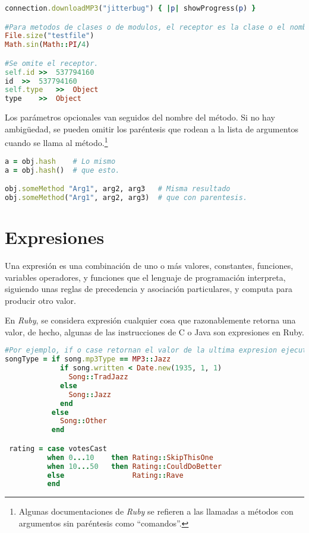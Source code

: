 \begin{lstlisting}[language=Ruby]
connection.downloadMP3("jitterbug") { |p| showProgress(p) }

#Para metodos de clases o de modulos, el receptor es la clase o el nombre del modulo.
File.size("testfile")
Math.sin(Math::PI/4)

#Se omite el receptor.
self.id	>>	537794160
id	>>	537794160
self.type	>>	Object
type	>>	Object
\end{lstlisting}

Los parámetros opcionales van seguidos del nombre del método. Si no hay ambigüedad, se pueden omitir los paréntesis que rodean a la lista de argumentos cuando se llama al método.\footnote{Algunas documentaciones de \textit{Ruby} se refieren a las llamadas a métodos con argumentos sin paréntesis como ``comandos''.}

\begin{lstlisting}[language=Ruby]
a = obj.hash    # Lo mismo
a = obj.hash()  # que esto.

obj.someMethod "Arg1", arg2, arg3   # Misma resultado
obj.someMethod("Arg1", arg2, arg3)  # que con parentesis.
\end{lstlisting}

\section{Expresiones}
Una expresión es una combinación de uno o más valores, constantes, funciones, variables operadores, y funciones que el lenguaje de programación interpreta, siguiendo unas reglas de precedencia y asociación particulares, y computa para producir otro valor.

En \textit{Ruby}, se considera expresión cualquier cosa que razonablemente retorna una valor, de hecho, algunas de las instrucciones de C o Java son expresiones en Ruby.

\begin{lstlisting}[language=Ruby]
#Por ejemplo, if o case retornan el valor de la ultima expresion ejecutada.
songType = if song.mp3Type == MP3::Jazz
             if song.written < Date.new(1935, 1, 1)
               Song::TradJazz
             else
               Song::Jazz
             end
           else
             Song::Other
           end

 rating = case votesCast
          when 0...10    then Rating::SkipThisOne
          when 10...50   then Rating::CouldDoBetter
          else                Rating::Rave
          end
\end{lstlisting}

